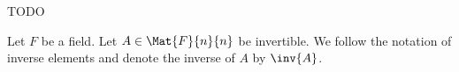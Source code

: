 


TODO


Let $F$ be a field.
Let $A \in \Mat{F}{n}{n}$
be invertible.
We follow the notation of
inverse elements and denote
the inverse of $A$ by
$\inv{A}$.
